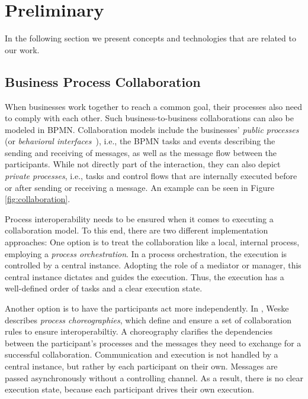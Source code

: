 \documentclass[runningheads]{llncs}
\begin{document}
\section{Preliminary} \label{preliminary}

In the following section we present concepts and technologies that are related to our work.

\subsection{Business Process Collaboration}

When businesses work together to reach a common goal, their processes also need to comply with each other.
Such business-to-business collaborations can also be modeled in BPMN.
Collaboration models include the businesses' \emph{public processes} (or \emph{behavioral interfaces}~\cite{Weske2012}), i.e., the BPMN tasks and events describing the sending and receiving of messages, as well as the message flow between the participants.
While not directly part of the interaction, they can also depict \emph{private processes}, i.e., tasks and control flows that are internally executed before or after sending or receiving a message.
An example can be seen in Figure \ref{fig:collaboration}.

Process interoperability needs to be ensured when it comes to executing a collaboration model.
To this end, there are two different implementation approaches:
One option is to treat the collaboration like a local, internal process, employing a \emph{process orchestration}.
In a process orchestration, the execution is controlled by a central instance.
Adopting the role of a mediator or manager, this central instance dictates and guides the execution.
Thus, the execution has a well-defined order of tasks and a clear execution state.

Another option is to have the participants act more independently.
In \cite{Weske2012}, Weske describes \emph{process choreographies}, which define and ensure a set of collaboration rules to ensure interoperabiltiy.
A choreography clarifies the dependencies between the participant's processes and the messages they need to exchange for a successful collaboration.
Communication and execution is not handled by a central instance, but rather by each participant on their own.
Messages are passed asynchronously without a controlling channel.
As a result, there is no clear execution state, because each participant drives their own execution.
\end{document}
